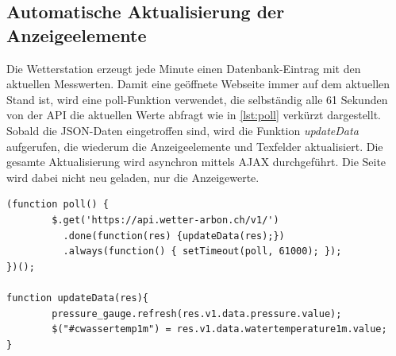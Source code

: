 



\subsection{Automatische Aktualisierung der Anzeigeelemente}
Die Wetterstation erzeugt jede Minute einen Datenbank-Eintrag mit den aktuellen Messwerten. Damit eine geöffnete Webseite immer auf dem aktuellen Stand ist, wird eine poll-Funktion verwendet, die selbständig alle 61 Sekunden von der API die aktuellen Werte abfragt wie in \ref{lst:poll} verkürzt dargestellt. Sobald die JSON-Daten eingetroffen sind, wird die Funktion \textit{updateData} aufgerufen, die wiederum die Anzeigeelemente und Texfelder aktualisiert. Die gesamte Aktualisierung wird asynchron mittels AJAX durchgeführt. Die Seite wird dabei nicht neu geladen, nur die Anzeigewerte. \newline


\begin{lstlisting}[label=lst:poll,caption=Automatische Aktualisierung der Werte, language=html]
(function poll() {
        $.get('https://api.wetter-arbon.ch/v1/')
          .done(function(res) {updateData(res);})
          .always(function() { setTimeout(poll, 61000); });
})();

function updateData(res){
        pressure_gauge.refresh(res.v1.data.pressure.value);
        $("#cwassertemp1m") = res.v1.data.watertemperature1m.value;
}
    
\end{lstlisting}















